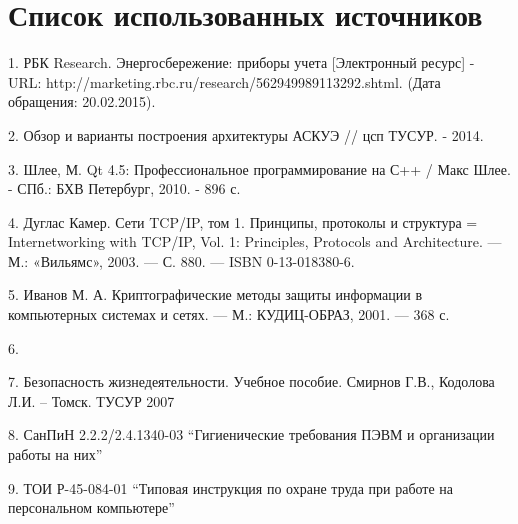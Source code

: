 


 
 
 \newpage
 \tableofcontents
 
 
 
 
 
 
 
 \newpage
 
 
 
 \newpage
 \section*{Список использованных источников}
 1. РБК Research. Энергосбережение: приборы учета [Электронный ресурс] - URL: http://marketing.rbc.ru/research/562949989113292.shtml. (Дата обращения: 20.02.2015).
 
 2. Обзор и варианты построения архитектуры АСКУЭ // цсп ТУСУР. - 2014.
 
 3. Шлее, М. Qt 4.5: Профессиональное программирование на С++ / Макс Шлее. - СПб.: БХВ Петербург, 2010. - 896 с.
 
 4. Дуглас Камер. Сети TCP/IP, том 1. Принципы, протоколы и структура = Internetworking with TCP/IP, Vol. 1: Principles, Protocols and Architecture. — М.: «Вильямс», 2003. — С. 880. — ISBN 0-13-018380-6.
 
 5. Иванов М. А. Криптографические методы защиты информации в компьютерных системах и сетях. — М.: КУДИЦ-ОБРАЗ, 2001. — 368 с.
 
 6. %
 
 7. Безопасность жизнедеятельности. Учебное пособие. Смирнов Г.В., Кодолова Л.И. – Томск. ТУСУР 2007
 
 8. СанПиН 2.2.2/2.4.1340-03 ``Гигиенические требования ПЭВМ и организации работы на них''
 
 9. ТОИ Р-45-084-01 ``Типовая инструкция по охране труда при работе на персональном компьютере''
 



